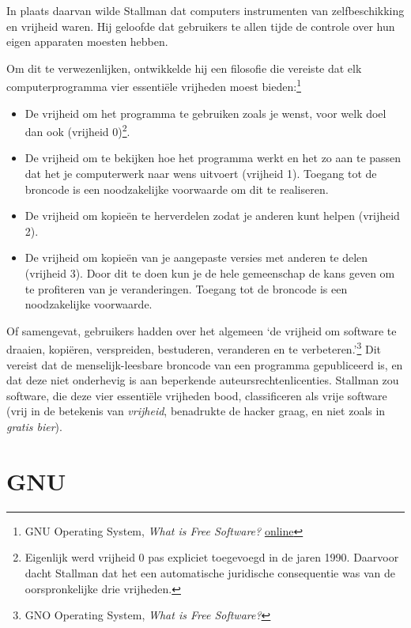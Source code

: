 \documentclass[
  a5paper,
  smalldemyvopaper,11pt,twoside,onecolumn,openright,extrafontsizes,
hidelinks]{memoir}
\begin{document}
In plaats daarvan wilde Stallman dat computers instrumenten van
zelfbeschikking en vrijheid waren. Hij geloofde dat gebruikers te allen
tijde de controle over hun eigen apparaten moesten hebben.

Om dit te verwezenlijken, ontwikkelde hij een filosofie die vereiste dat
elk computerprogramma vier essentiële vrijheden moest bieden:\footnote{\hspace{0pt}GNU
  Operating System, \emph{What is Free Software?}
  \href{https://www.gnu.org/philosophy/free-sw.html}{online}}

\begin{itemize}
\item
  De vrijheid om het programma te gebruiken zoals je wenst, voor welk
  doel dan ook (vrijheid 0)\footnote{Eigenlijk werd vrijheid 0 pas
    expliciet toegevoegd in de jaren 1990. Daarvoor dacht Stallman dat
    het een automatische juridische consequentie was van de
    oorspronkelijke drie vrijheden.}.
\item
  De vrijheid om te bekijken hoe het programma werkt en het zo aan te
  passen dat het je computerwerk naar wens uitvoert (vrijheid 1).
  Toegang tot de broncode is een noodzakelijke voorwaarde om dit te
  realiseren.
\item
  De vrijheid om kopieën te herverdelen zodat je anderen kunt helpen
  (vrijheid 2).
\item
  De vrijheid om kopieën van je aangepaste versies met anderen te delen
  (vrijheid 3). Door dit te doen kun je de hele gemeenschap de kans
  geven om te profiteren van je veranderingen. Toegang tot de broncode
  is een noodzakelijke voorwaarde.
\end{itemize}

Of samengevat, gebruikers hadden over het algemeen `de vrijheid om
software te draaien, kopiëren, verspreiden, bestuderen, veranderen en te
verbeteren.'\footnote{\hspace{0pt}GNO Operating System, \emph{What is
  Free Software?}} Dit vereist dat de menselijk-leesbare broncode van
een programma gepubliceerd is, en dat deze niet onderhevig is aan
beperkende auteursrechtenlicenties. Stallman zou software, die deze vier
essentiële vrijheden bood, classificeren als vrije software (vrij in de
betekenis van \emph{vrijheid}, benadrukte de hacker graag, en niet zoals
in \emph{gratis bier}).

\section{GNU}\label{gnu}
\end{document}
